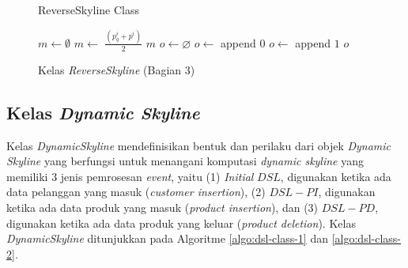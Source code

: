 \begin{figure}[H]
	\begin{algorithm}[H]
		\caption{ReverseSkyline Class}
		\begin{algorithmic}[1]
			\State $m \leftarrow \emptyset$
			 $m \leftarrow$ $\frac{(p_q^i + p^i)}{2}$
			\EndFor
			\State \Return $m$
			\EndProcedure
			\State $o \leftarrow \varnothing$
			 $o \leftarrow$ append $0$
			\Else {} $o \leftarrow$ append $1$
			\EndIf
			\EndFor
			\State \Return $o$
			\EndProcedure
		\end{algorithmic}
	\end{algorithm}
	\caption{Kelas \textit{ReverseSkyline} (Bagian 3) \label{algo:rsl-class-3}}
\end{figure}

\subsection{Kelas \textit{Dynamic Skyline}}
\tab Kelas \textit{DynamicSkyline} mendefinisikan bentuk dan perilaku dari objek \textit{Dynamic Skyline} yang berfungsi untuk menangani komputasi \textit{dynamic skyline} yang memiliki 3 jenis pemrosesan \textit{event}, yaitu (1) \textit{Initial} $DSL$, digunakan ketika ada data pelanggan yang masuk (\textit{customer insertion}), (2) $DSL-PI$, digunakan ketika ada data produk yang masuk (\textit{product insertion}), dan (3) $DSL-PD$, digunakan ketika ada data produk yang keluar (\textit{product deletion}). Kelas \textit{DynamicSkyline} ditunjukkan pada Algoritme \ref{algo:dsl-class-1} dan \ref{algo:dsl-class-2}.


